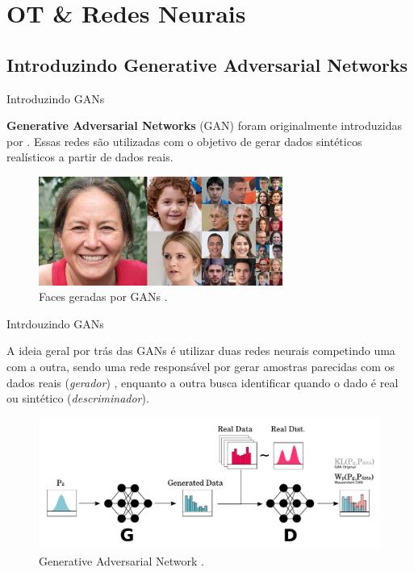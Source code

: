 \documentclass[10pt]{beamer}
\begin{document}
\AtBeginSection{}
\section[Aplicações OT]{OT \& Redes Neurais}
\subsection[WGAN]{Introduzindo Generative Adversarial Networks}
\begin{frame}[fragile]{Introduzindo GANs}

	\textbf{Generative Adversarial Networks} (GAN)
	foram originalmente introduzidas por \citet{goodfellow2014}.
	Essas redes são utilizadas com o objetivo de gerar
	dados sintéticos realísticos a partir de dados reais.

	\begin{figure}[H]
		\centering
		\includegraphics[width=8cm]{Figures/gans-faces.png}
		\caption{Faces geradas por GANs \citep{karras2018}.}
	\end{figure}

\end{frame}

\begin{frame}[fragile]{Intrdouzindo GANs}

	A ideia geral por trás das GANs é utilizar duas redes neurais
	competindo uma com a outra, sendo uma rede responsável por
	gerar amostras parecidas com os dados reais (\textit{gerador}) , enquanto a outra
	busca identificar quando o dado é real ou sintético
	(\textit{descriminador}).

	\begin{figure}[H]
		\begin{center}
			\includegraphics[width=1.0\textwidth]{Figures/wgan.pdf}
		\end{center}
		\caption{Generative Adversarial Network \citep{sales2021optimal}.}
	\end{figure}

\end{frame}
\end{document}

